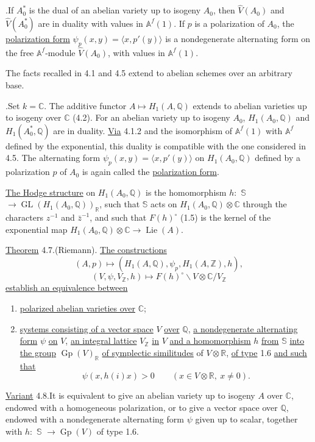 \documentclass[10pt]{article}
\newcommand{\Af}{\mathbb A^f}
\newcommand{\C}{\mathbb C}
\newcommand{\Q}{\mathbb Q}
\newcommand{\R}{\mathbb R}
\newcommand{\Z}{\mathbb Z}
\newcommand{\bS}{\mathbb S}
\newcommand{\GL}{\operatorname{GL}}
\newcommand{\Gp}{\operatorname{Gp}}
\newcommand{\Lie}{\operatorname{Lie}}
\begin{document}
.\quad If $A_0^*$ is the dual of an abelian variety up to isogeny $A_0$, then $\widehat V(A_0)$ and $\widehat V(A_0^*)$ are in duality with values in $\Af(1)$. If $p$ is a polarization of $A_0$, the \uline{polarization form} $\psi_p(x,y)=\langle x,p'(y)\rangle$ is a nondegenerate alternating form on the free $\Af$-module $\widehat V(A_0)$, with values in $\Af(1)$.

The facts recalled in 4.1 and 4.5 extend to abelian schemes over an arbitrary base.

.\quad Set $k=\C$. The additive functor $A\mapsto H_1(A,\Q)$ extends to abelian varieties up to isogeny over $\C$ (4.2). For an abelian variety up to isogeny $A_0$, $H_1(A_0,\Q)$ and $H_1(A_0^*,\Q)$ are in duality. \uline{Via} 4.1.2 and the isomorphism of $\Af(1)$ with $\Af$ defined by the exponential, this duality is compatible with the one considered in 4.5. The alternating form $\psi_p(x,y)=\langle x,p'(y)\rangle$ on $H_1(A_0,\Q)$ defined by a polarization $p$ of $A_0$ is again called the \uline{polarization form}.

\uline{The Hodge structure} on $H_1(A_0,\Q)$ is the homomorphism $h:$ \uline{$\bS$} $\longrightarrow \GL(H_1(A_0,\Q))_\R$, such that \uline{$\bS$} acts on $H_1(A_0,\Q)\otimes\C$ through the characters $z^{-1}$ and $\bar z^{-1}$, and such that $F(h)^\circ$ (1.5) is the kernel of the exponential map $H_1(A_0,\Q)\otimes\C\longrightarrow\Lie(A)$.

\noindent \uline{Theorem} 4.7.\quad (Riemann). \uline{The constructions}
\[
(A,p)\longmapsto (H_1(A,\Q),\psi_p,H_1(A,\Z),h),
\]
\[
(V,\psi,V_\Z,h)\longmapsto
F(h)^\circ\backslash V\otimes\C/V_\Z
\]
\uline{establish an equivalence between}
\begin{enumerate}[label=(\alph*)]
\item \uline{polarized abelian varieties over} $\C$;
\item \uline{systems consisting of a vector space} $V$ \uline{over} $\Q$, \uline{a nondegenerate alternating form} $\psi$ \uline{on} $V$, \uline{an integral lattice} $V_\Z$ \uline{in} $V$ \uline{and a homomorphism} $h$ \uline{from} \uline{$\bS$} \uline{into the group} $\Gp(V)_\R$ \uline{of symplectic similitudes} of $V\otimes\R$, \uline{of type} 1.6 \uline{and such that}
\[
\psi(x,h(i)x)>0\qquad(x\in V\otimes\R,\ x\ne0).
\]
\end{enumerate}

\noindent \uline{Variant} 4.8.\quad It is equivalent to give an abelian variety up to isogeny $A$ over $\C$, endowed with a homogeneous polarization, or to give a vector space over $\Q$, endowed with a nondegenerate alternating form $\psi$ given up to scalar, together with $h:$ \uline{$\bS$} $\longrightarrow\Gp(V)$ of type 1.6.
\end{document}
